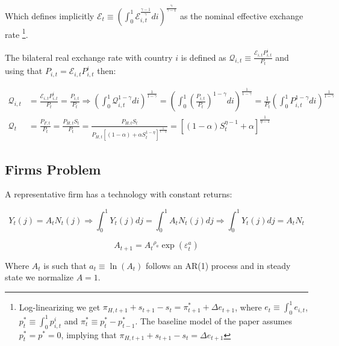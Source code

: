 \documentclass{article}
\newcommand{\E}{\mathcal{E}}
\begin{document}
Which defines implicitly $\E_{t} \equiv \left( \int^1_0 \E_{i,t}^{\frac{\gamma-1}{\gamma}} di \right)^{\frac{\gamma}{\gamma-1}}$ as the nominal effective exchange rate \footnote{Log-linearizing we get $\pi_{H,t+1} + s_{t+1} - s_t = \pi^*_{t+1} + \Delta e_{t+1}$, where $e_t \equiv \int^1_0 e_{i,t}$, $p_t^* \equiv \int^1_0 p^i_{i,t}$ and $\pi^*_t \equiv p_t^* - p_{t-1}^*$. The baseline model of the paper assumes $p_t^* = p^* = 0$, implying that $\pi_{H,t+1} + s_{t+1} - s_t = \Delta e_{t+1}$}.

The bilateral real exchange rate with country $i$ is defined as $\mathcal{Q}_{i,t} \equiv \frac{\E_{i,t} P^i_{i,t}}{P_t}$ and using that $P_{i,t} = \E_{i,t} P^i_{i,t}$ then:

\begin{equation}
\label{real_rate}
\begin{split}
\mathcal{Q}_{i,t} & = \frac{\E_{i,t} P^i_{i,t}}{P_t} = \frac{P_{i,t}}{P_t} \Rightarrow \left( \int^1_0 \mathcal Q_{i,t}^{1-\gamma} di \right)^{\frac{1}{1-\gamma}} = \left( \int^1_0 \left(\frac{P_{i,t}}{P_t}\right)^{1-\gamma} di \right)^{\frac{1}{1-\gamma}} = \frac{1}{P_t}\left( \int^1_0 P_{i,t}^{1-\gamma} di \right)^{\frac{1}{1-\gamma}} \\
\mathcal{Q}_{t} & = \frac{P_{F,t}}{P_t} = \frac{P_{H,t} S_t}{P_t} = \frac{P_{H,t} S_t}{P_{H,t} \left[(1-\alpha) + \alpha S_t^{1-\eta} \right]^{\frac{1}{1-\eta}}} = \left[(1-\alpha)S_t^{\eta-1} + \alpha \right]^{\frac{1}{\eta-1}}
\end{split}
\end{equation}


\subsection{Firms Problem}
A representative firm has a technology with constant returns:

\begin{equation}
    \label{technology}
    Y_t(j) = A_t N_t(j) \Rightarrow \int^1_0 Y_t(j) dj = \int^1_0 A_t N_t(j) dj \Rightarrow \int^1_0 Y_t(j) dj = A_t N_t 
\end{equation}

\begin{equation}
    \label{tfp}
    A_{t+1} = {A_t}^{\rho_a}\exp( \varepsilon^a_t)
\end{equation}

Where $A_t$ is such that $a_t \equiv \ln(A_t)$ follows an AR(1) process and in steady state we normalize $A = 1$.\\
\end{document}
